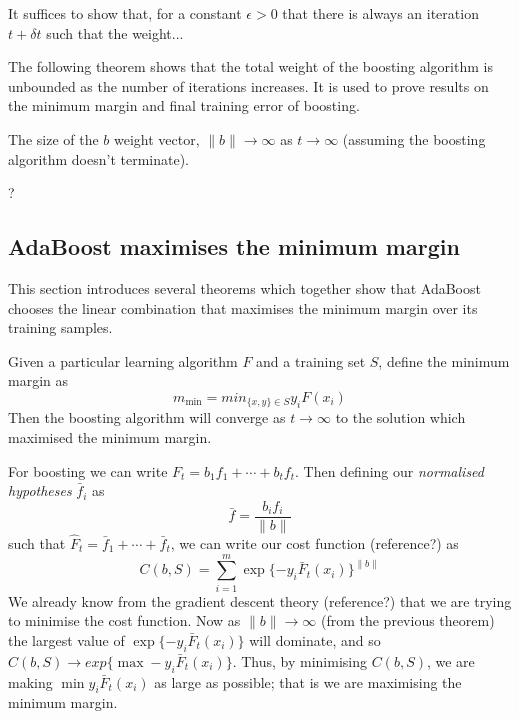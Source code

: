 \begin{theorem}
\label{thm:increasing classifier weights}
\end{theorem}

\proof It suffices to show that, for a constant $\epsilon > 0$ that
there is always an iteration $t + \delta t$ such that the weight...


The following theorem shows that the total weight of the boosting
algorithm is unbounded as the number of iterations increases.  It is
used to prove results on the minimum margin and final training error
of boosting.

\begin{theorem}
The size of the $b$ weight vector, $\|b\| \rightarrow \infty$
as $t \rightarrow \infty$ (assuming the boosting algorithm doesn't
terminate).

\proof ?
\end{theorem}



\subsection{AdaBoost maximises the minimum margin}

This section introduces several theorems which together show that
AdaBoost chooses the linear combination that maximises the minimum
margin over its training samples.

\begin{theorem}
Given a particular learning algorithm $F$ and a training
set $S$, define the minimum margin as
\[
m_{\min} = min_{\{x,y\} \in S} y_i F(x_i)
\]
Then the boosting algorithm will converge as $t \rightarrow \infty$ to
the solution which maximised the minimum margin.

\proof For boosting we can write $F_t = b_1 f_1 + \cdots + b_t f_t$.
Then defining our \emph{normalised hypotheses} $\bar{f}_i$ as
\[
\bar{f} = \frac{b_i f_i}{\|b\|}
\]
such that $\hat{F}_t = \bar{f}_1 + \cdots + \bar{f}_t$, we can write
our cost function (reference?) as 
\[
C(b, S) = \sum_{i=1}^{m} \exp\{-y_i \bar{F}_t(x_i)\}^{\|b\|}
\]
We already know from the gradient descent theory (reference?) that we
are trying to minimise the cost function.  Now as $\|b\| \rightarrow
\infty$ (from the previous theorem) the largest value of $\exp\{-y_i
\bar{F}_t(x_i)\}$ will dominate, and so $C(b, S) \rightarrow exp\{\max
-y_i \bar{F}_t(x_i)\}$.  Thus, by minimising $C(b, S)$, we are making
$\min y_i \bar{F}_t(x_i)$ as large as possible; that is we are
maximising the minimum margin.
\end{theorem}


